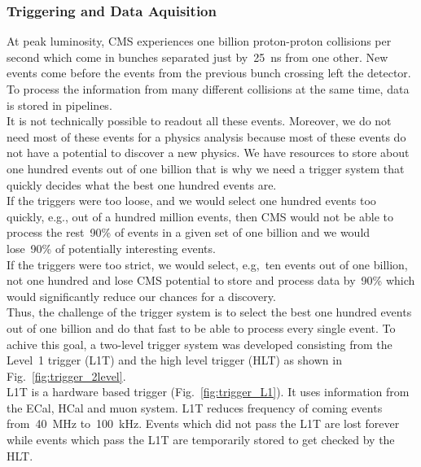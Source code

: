 \subsubsection{Triggering and Data Aquisition}

At peak luminosity, CMS experiences one billion proton-proton collisions per second which come in bunches separated just by~25~ns from one other. New events come before the events from the previous bunch crossing left the detector. To process the information from many different collisions at the same time, data is stored in pipelines. \\

It is not technically possible to readout all these events. Moreover, we do not need most of these events for a physics analysis because most of these events do not have a potential to discover a new physics. We have resources to store about one hundred events out of one billion that is why we need a trigger system that quickly decides what the best one hundred events are.\\

If the triggers were too loose, and we would select one hundred events too quickly, e.g., out of a hundred million events, then CMS would not be able to process the rest~90\% of events in a given set of one billion and we would lose~90\% of potentially interesting events.\\

If the triggers were too strict, we would select, e.g,~ten events out of one billion, not one hundred and lose CMS potential to store and process data by~90\% which would significantly reduce our chances for a discovery.\\

Thus, the challenge of the trigger system is to select the best one hundred events out of one billion and do that fast to be able to process every single event. To achive this goal, a two-level trigger system was developed consisting from the Level~1 trigger (L1T) and the high level trigger (HLT) as shown in Fig.~\ref{fig:trigger_2level}.\\

L1T is a hardware based trigger (Fig.~\ref{fig:trigger_L1}). It uses information from the ECal, HCal and muon system. L1T reduces frequency of coming events from~40~MHz to~100~kHz. Events which did not pass the L1T are lost forever while events which pass the L1T are temporarily stored to get checked by the HLT.\\

